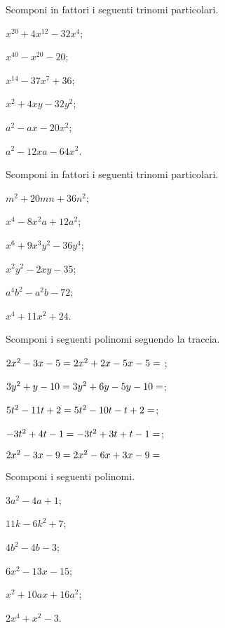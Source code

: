 \begin{esercizio}
 \label{ese:17.7}
 Scomponi in fattori i seguenti trinomi particolari.
 \begin{multicols}{3}
 \begin{enumeratea}
 \item $x^{20}+4x^{12}-32x^{4}$;
 \item $x^{40}-x^{20}-20$;
 \item $x^{14}-37x^{7}+36$;
 \item $x^{2}+4xy-32y^{2}$;
 \item $a^{2}-ax-20x^{2}$;
 \item $a^{2}-12xa-64x^{2}$.
 \end{enumeratea}
\end{multicols}
\end{esercizio}

\begin{esercizio}
 \label{ese:17.8}
 Scomponi in fattori i seguenti trinomi particolari.
 \begin{multicols}{3}
 \begin{enumeratea}
 \item $m^{2}+20mn+36n^{2}$;
 \item $x^{4}-8x^{2}a+12a^{2}$;
 \item $x^{6}+9x^{3}y^{2}-36y^{4}$;
 \item $x^{2}y^{2}-2xy-35$;
 \item $a^{4}b^{2}-a^{2}b-72$;
 \item $x^{4}+11x^{2}+24$.
 \end{enumeratea}
\end{multicols}
\end{esercizio}

\begin{esercizio}[\Ast]
 \label{ese:17.9}
 Scomponi i seguenti polinomi seguendo la
traccia.
 \begin{enumeratea}
 \item $2x^{{2}}-3x-5=2x^{2}+2x-5x-5=\dotfill~$;
 \item $3y^{{2}}+y-10 = 3y^{2}+6y-5y-10 =\dotfill$;
 \item $5t^{{2}}-11t+2 = 5t^{2}-10t-t+2 =\dotfill$;
 \item $-3t^{{2}}+4t-1= -3t^{2}+3t+t-1 = \dotfill$;
 \item $2x^{2}-3x-9= 2x^{2}-6x+3x-9 = \dotfill$
 \end{enumeratea}
\end{esercizio}

\begin{esercizio}
 \label{ese:17.10}
 Scomponi i seguenti polinomi.
\begin{multicols}{3}
 \begin{enumeratea}
 \item $3a^{{2}}-4a+1$;
 \item $11k-6k^{2}+7$;
 \item $4b^{{2}}-4b-3$;
 \item $6x^{2}-13x-15$;
 \item $x^{2}+10ax+16a^{2}$;
 \item $2x^{{4}}+x^{{2}}-3$.
 \end{enumeratea}
\end{multicols}
 \end{esercizio}

